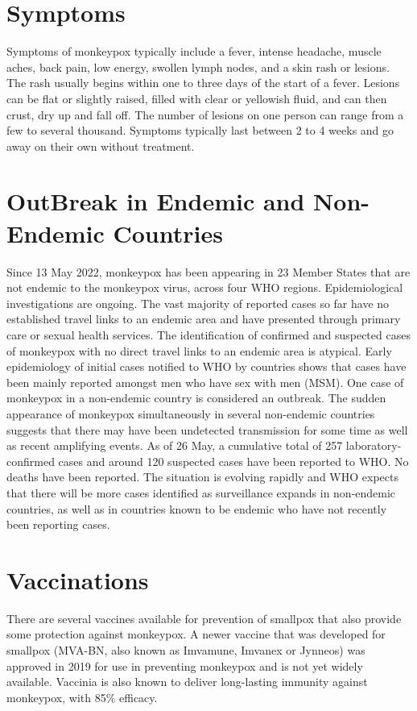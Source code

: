 \section{Symptoms}

Symptoms of monkeypox typically include a fever, intense headache, muscle aches, back pain, low energy, swollen lymph nodes, and a skin rash or lesions. The rash usually begins within one to three days of the start of a fever. Lesions can be flat or slightly raised, filled with clear or yellowish fluid, and can then crust, dry up and fall off. The number of lesions on one person can range from a few to several thousand. Symptoms typically last between 2 to 4 weeks and go away on their own without treatment.

\section{OutBreak in Endemic and Non-Endemic Countries}
Since 13 May 2022, monkeypox has been appearing in 23 Member States that are not endemic to the monkeypox virus, across four WHO regions. Epidemiological investigations are ongoing. The vast majority of reported cases so far have no established travel links to an endemic area and have presented through primary care or sexual health services. The identification of confirmed and suspected cases of monkeypox with no direct travel links to an endemic area is atypical. Early epidemiology of initial cases notified to WHO by countries shows that cases have been mainly reported amongst men who have sex with men (MSM). One case of monkeypox in a non-endemic country is considered an outbreak. The sudden appearance of monkeypox simultaneously in several non-endemic countries suggests that there may have been undetected transmission for some time as well as recent amplifying events.
As of 26 May, a cumulative total of 257 laboratory-confirmed cases and around 120 suspected cases have been reported to WHO. No deaths have been reported.
The situation is evolving rapidly and WHO expects that there will be more cases identified as surveillance expands in non-endemic countries, as well as in countries known to be endemic who have not recently been reporting cases.

\section{Vaccinations}
There are several vaccines available for prevention of smallpox that also provide some protection against monkeypox. A newer vaccine that was developed for smallpox (MVA-BN, also known as Imvamune, Imvanex or Jynneos) was approved in 2019 for use in preventing monkeypox and is not yet widely available. Vaccinia is also known to deliver long-lasting immunity against
monkeypox, with 85\% efficacy.
